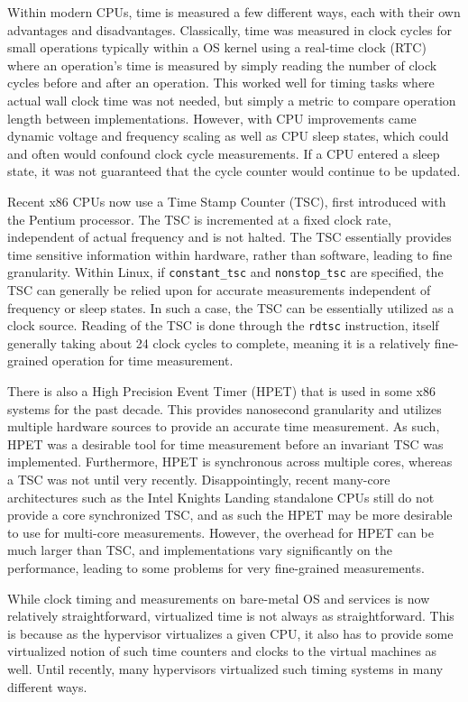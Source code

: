 Within modern CPUs, time is measured a few different ways, each with their own advantages and disadvantages.  Classically, time was measured in clock cycles for small operations typically within a OS kernel using a real-time clock (RTC) where an operation's time is measured by simply reading the number of clock cycles before and after an operation. This worked well for timing tasks where actual wall clock time was not needed, but simply a metric to compare operation length between implementations. However, with CPU improvements came dynamic voltage and frequency scaling as well as CPU sleep states, which could and often would confound clock cycle measurements.  If a CPU entered a sleep state, it was not guaranteed that the cycle counter would continue to be updated. 

Recent x86 CPUs now use a Time Stamp Counter (TSC), first introduced with the Pentium processor. The TSC is incremented at a fixed clock rate, independent of actual frequency and is not halted. The TSC essentially provides time sensitive information within hardware, rather than software, leading to fine granularity. Within Linux, if \verb|constant_tsc| and \verb|nonstop_tsc| are specified, the TSC can generally be relied upon for accurate measurements independent of frequency or sleep states. In such a case, the TSC can be essentially utilized as a clock source. Reading of the TSC is done through the \verb|rdtsc| instruction, itself generally taking about 24 clock cycles to complete, meaning it is a relatively fine-grained operation for time measurement.

There is also a High Precision Event Timer (HPET) that is used in some x86 systems for the past decade. This provides nanosecond granularity and utilizes multiple hardware sources to provide an accurate time measurement. As such, HPET was a desirable tool for time measurement before an invariant TSC was implemented. Furthermore, HPET is synchronous across multiple cores, whereas a TSC was not until very recently.  Disappointingly, recent many-core architectures such as the Intel Knights Landing standalone CPUs still do not provide a core synchronized TSC, and as such the HPET may be more desirable to use for multi-core measurements. However, the overhead for HPET can be much larger than TSC, and implementations vary significantly on the performance, leading to some problems for very fine-grained measurements. 

While clock timing and measurements on bare-metal OS and services is now relatively straightforward, virtualized time is not always as straightforward.  This is because as the hypervisor virtualizes a given CPU, it also has to provide some virtualized notion of such time counters and clocks to the virtual machines as well.  Until recently, many hypervisors virtualized such timing systems in many different ways. 

